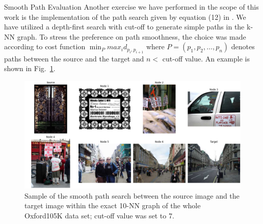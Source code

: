 \begin{frame}
\begin{block}{Smooth Path Evaluation}
	Another exercise we have performed in the scope of this work is the implementation of the path search given by equation (12) in \cite{Johnson2017}. We have utilized a depth-first search with cut-off to generate simple paths in the k-NN graph. To stress the preference on path smoothness, the choice was made according to cost function $\min_{P} max_{i} d_{p_{i}, p_{i+1}}$ where $P = (p_{1}, p_{2}, \dots, p_{n})$ denotes paths between the source and the target and $n <$ cut-off value. An example is shown in Fig.~\ref{fig:smooth_path}.
\end{block}

\end{frame}


\begin{frame}

\begin{figure}
\centering
\includegraphics[width=0.85\linewidth,height=0.65\textheight]{../images/knn/path}
\caption{Sample of the smooth path search between the source image and the target image within the exact 10-NN graph of the whole Oxford105K data set; cut-off value was set to 7.}
\label{fig:smooth_path}
\end{figure}

\end{frame}